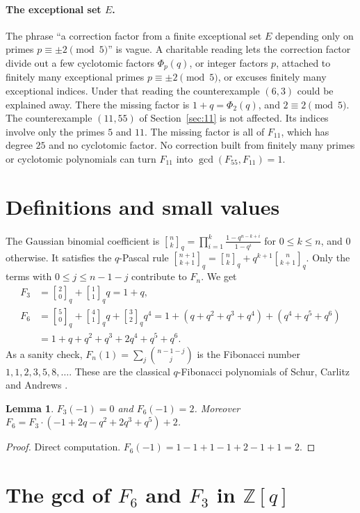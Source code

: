 \documentclass[11pt]{article}
\newtheorem{lemma}[theorem]{Lemma}
\theoremstyle{remark}
\newcommand{\qbinom}[2]{\genfrac{[}{]}{0pt}{}{#1}{#2}_q}
\begin{document}
\paragraph{The exceptional set $E$.} The phrase ``a correction factor from a
finite exceptional set $E$ depending only on primes $p\equiv\pm2\pmod5$'' is
vague. A charitable reading lets the correction factor divide out a few
cyclotomic factors $\Phi_p(q)$, or integer factors $p$, attached to finitely
many exceptional primes $p\equiv\pm2\pmod 5$, or excuses finitely many
exceptional indices. Under that reading the counterexample $(6,3)$ could be
explained away. There the missing factor is $1+q=\Phi_2(q)$, and $2\equiv2\pmod5$.
The counterexample $(11,55)$ of Section~\ref{sec:11} is not affected. Its
indices involve only the primes $5$ and $11$. The missing factor is all of
$F_{11}$, which has degree $25$ and no cyclotomic factor. No correction built
from finitely many primes or cyclotomic polynomials can turn $F_{11}$ into
$\gcd(F_{55},F_{11})=1$.

\section{Definitions and small values}

The Gaussian binomial coefficient is
$\qbinom{n}{k}=\prod_{i=1}^{k}\frac{1-q^{n-k+i}}{1-q^{i}}$ for $0\le k\le n$, and
$0$ otherwise. It satisfies the $q$-Pascal rule
$\qbinom{n+1}{k+1}=\qbinom{n}{k}+q^{k+1}\qbinom{n}{k+1}$. Only the terms with
$0\le j\le n-1-j$ contribute to $F_n$. We get
\begin{align*}
F_3&=\qbinom{2}{0}+\qbinom{1}{1}q=1+q,\\
F_6&=\qbinom{5}{0}+\qbinom{4}{1}q+\qbinom{3}{2}q^4
 =1+(q+q^2+q^3+q^4)+(q^4+q^5+q^6)\\
&=1+q+q^2+q^3+2q^4+q^5+q^6 .
\end{align*}
As a sanity check, $F_n(1)=\sum_j\binom{n-1-j}{j}$ is the Fibonacci number
$1,1,2,3,5,8,\dots$. These are the classical $q$-Fibonacci polynomials of
Schur, Carlitz and Andrews \cite{carlitz,andrews}.

\begin{lemma}\label{lem:values}
$F_3(-1)=0$ and $F_6(-1)=2$. Moreover $F_6=F_3\cdot(-1+2q-q^2+2q^3+q^5)+2$.
\end{lemma}
\begin{proof}
Direct computation. $F_6(-1)=1-1+1-1+2-1+1=2$.
\end{proof}

\section{\texorpdfstring{The gcd of $F_6$ and $F_3$ in $\mathbb Z[q]$}{The gcd of F6 and F3 in Z[q]}}
\end{document}
